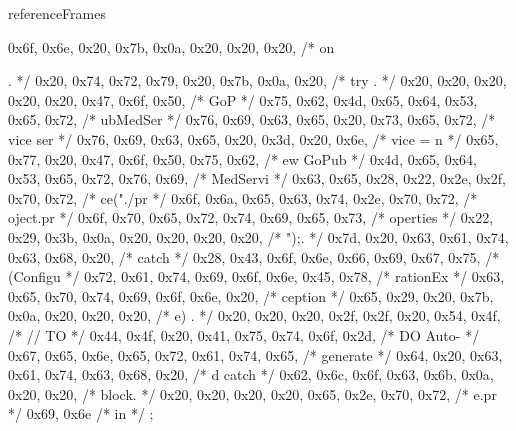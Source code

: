 \begin{chunk}{referenceFrames}
{{0x6f, 0x6e, 0x20, 0x7b, 0x0a, 0x20, 0x20, 0x20, /* on {.    */
0x20, 0x74, 0x72, 0x79, 0x20, 0x7b, 0x0a, 0x20, /*  try {.  */
0x20, 0x20, 0x20, 0x20, 0x20, 0x47, 0x6f, 0x50, /*      GoP */
0x75, 0x62, 0x4d, 0x65, 0x64, 0x53, 0x65, 0x72, /* ubMedSer */
0x76, 0x69, 0x63, 0x65, 0x20, 0x73, 0x65, 0x72, /* vice ser */
0x76, 0x69, 0x63, 0x65, 0x20, 0x3d, 0x20, 0x6e, /* vice = n */
0x65, 0x77, 0x20, 0x47, 0x6f, 0x50, 0x75, 0x62, /* ew GoPub */
0x4d, 0x65, 0x64, 0x53, 0x65, 0x72, 0x76, 0x69, /* MedServi */
0x63, 0x65, 0x28, 0x22, 0x2e, 0x2f, 0x70, 0x72, /* ce("./pr */
0x6f, 0x6a, 0x65, 0x63, 0x74, 0x2e, 0x70, 0x72, /* oject.pr */
0x6f, 0x70, 0x65, 0x72, 0x74, 0x69, 0x65, 0x73, /* operties */
0x22, 0x29, 0x3b, 0x0a, 0x20, 0x20, 0x20, 0x20, /* ");.     */
0x7d, 0x20, 0x63, 0x61, 0x74, 0x63, 0x68, 0x20, /* } catch  */
0x28, 0x43, 0x6f, 0x6e, 0x66, 0x69, 0x67, 0x75, /* (Configu */
0x72, 0x61, 0x74, 0x69, 0x6f, 0x6e, 0x45, 0x78, /* rationEx */
0x63, 0x65, 0x70, 0x74, 0x69, 0x6f, 0x6e, 0x20, /* ception  */
0x65, 0x29, 0x20, 0x7b, 0x0a, 0x20, 0x20, 0x20, /* e) {.    */
0x20, 0x20, 0x20, 0x2f, 0x2f, 0x20, 0x54, 0x4f, /*    // TO */
0x44, 0x4f, 0x20, 0x41, 0x75, 0x74, 0x6f, 0x2d, /* DO Auto- */
0x67, 0x65, 0x6e, 0x65, 0x72, 0x61, 0x74, 0x65, /* generate */
0x64, 0x20, 0x63, 0x61, 0x74, 0x63, 0x68, 0x20, /* d catch  */
0x62, 0x6c, 0x6f, 0x63, 0x6b, 0x0a, 0x20, 0x20, /* block.   */
0x20, 0x20, 0x20, 0x20, 0x65, 0x2e, 0x70, 0x72, /*     e.pr */
0x69, 0x6e                                      /* in */
};

}}}
\end{chunk}
